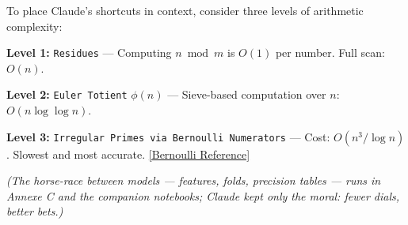 To place Claude’s shortcuts in context, consider three levels of arithmetic complexity:

\begin{tcolorbox}[
  title=The Arithmetic Complexity Staircase,
  colback=blue!2!white,
  colframe=blue!75!black,
  boxrule=0.7pt,
  arc=4pt,
  left=6pt,right=6pt,top=4pt,bottom=4pt
]
\textbf{Level 1:} \texttt{Residues} — Computing $n\bmod m$ is $O(1)$ per number. Full scan: $O(n)$.  

\vspace{0.3em}
\textbf{Level 2:} \texttt{Euler Totient} $\phi(n)$ — Sieve-based computation over $n$: $O(n\log\log n)$.  

\vspace{0.3em}
\textbf{Level 3:} \texttt{Irregular Primes via Bernoulli Numerators} — Cost: $\boxed{O(n^{3}/\log n)}$. Slowest and most accurate.  
\href{https://colab.research.google.com/drive/1K1Z1-uYhPIOCX89DaqeicSSG-k7JYkNH?usp=sharing}{[Bernoulli Reference]}
\end{tcolorbox}

\textit{(The horse-race between models --- features, folds, precision tables --- runs in Annexe C and the companion notebooks; Claude kept only the moral: fewer dials, better bets.)}

